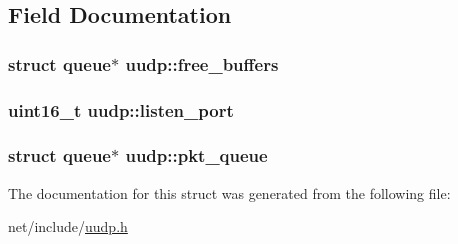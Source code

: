 \subsection{Field Documentation}
\hypertarget{structuudp_a82b920ae77d6f50adebe104fde7bd372}{
\subsubsection[{free\-\_\-buffers}]{\setlength{\rightskip}{0pt plus 5cm}struct {\bf queue}$\ast$ uudp\-::free\-\_\-buffers}}\label{structuudp_a82b920ae77d6f50adebe104fde7bd372}
\hypertarget{structuudp_a00e34c9d365186d751ac02d8fd8fb130}{
\subsubsection[{listen\-\_\-port}]{\setlength{\rightskip}{0pt plus 5cm}uint16\-\_\-t uudp\-::listen\-\_\-port}}\label{structuudp_a00e34c9d365186d751ac02d8fd8fb130}
\hypertarget{structuudp_a173d6e92d93ed6c5a8e6bae66a66c132}{
\subsubsection[{pkt\-\_\-queue}]{\setlength{\rightskip}{0pt plus 5cm}struct {\bf queue}$\ast$ uudp\-::pkt\-\_\-queue}}\label{structuudp_a173d6e92d93ed6c5a8e6bae66a66c132}


The documentation for this struct was generated from the following file\-:\begin{DoxyCompactItemize}
\item 
net/include/\hyperlink{uudp_8h}{uudp.\-h}\end{DoxyCompactItemize}
